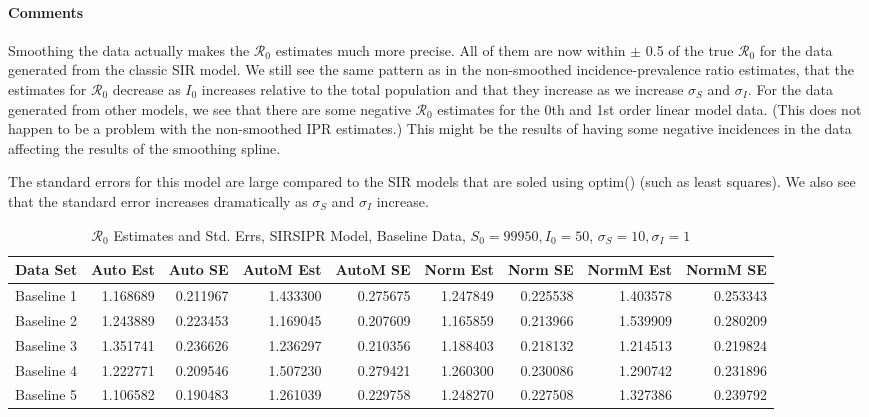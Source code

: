 \documentclass[12pt]{article}
\newcommand{\rr}{\ensuremath{\mathcal{R}_0}}
\begin{document}
\paragraph{Comments}

Smoothing the data actually makes the $\rr$ estimates much more precise. All of them are now within $\pm$ 0.5 of the true $\rr$ for the data generated from the classic SIR model. We still see the same pattern as in the non-smoothed incidence-prevalence ratio estimates, that the estimates for $\rr$ decrease as $I_0$ increases relative to the total population and that they increase as we increase $\sigma_S$ and $\sigma_I$. For the data generated from other models, we see that there are some negative $\rr$ estimates for the 0th and 1st order linear model data. (This does not happen to be a problem with the non-smoothed IPR estimates.) This might be the results of having some negative incidences in the data affecting the results of the smoothing spline. 

The standard errors for this model are large compared to the SIR models that are soled using optim() (such as least squares). We also see that the standard error increases dramatically as $\sigma_S$ and $\sigma_I$ increase. 

\begin{table}[H]
	
	\caption{$\rr$ Estimates and Std. Errs, SIRSIPR Model,
		Baseline Data, $S_0 = 99950, I_0 = 50$, 
		$\sigma_S = 10, \sigma_I = 1$}
	\begin{footnotesize}
		\hskip -1cm
	\begin{tabular}{l|r|r|r|r|r|r|r|r}
		\hline
		Data Set & Auto Est & Auto SE & AutoM Est & AutoM SE & Norm Est & Norm SE & NormM Est & NormM SE\\
		\hline
		Baseline 1 & 1.168689 & 0.211967 & 1.433300 & 0.275675 & 1.247849 & 0.225538 & 1.403578 & 0.253343\\
		\hline
		Baseline 2 & 1.243889 & 0.223453 & 1.169045 & 0.207609 & 1.165859 & 0.213966 & 1.539909 & 0.280209\\
		\hline
		Baseline 3 & 1.351741 & 0.236626 & 1.236297 & 0.210356 & 1.188403 & 0.218132 & 1.214513 & 0.219824\\
		\hline
		Baseline 4 & 1.222771 & 0.209546 & 1.507230 & 0.279421 & 1.260300 & 0.230086 & 1.290742 & 0.231896\\
		\hline
		Baseline 5 & 1.106582 & 0.190483 & 1.261039 & 0.229758 & 1.248270 & 0.227508 & 1.327386 & 0.239792\\
		\hline
	\end{tabular}
\end{footnotesize}
\end{table}
\end{document}

